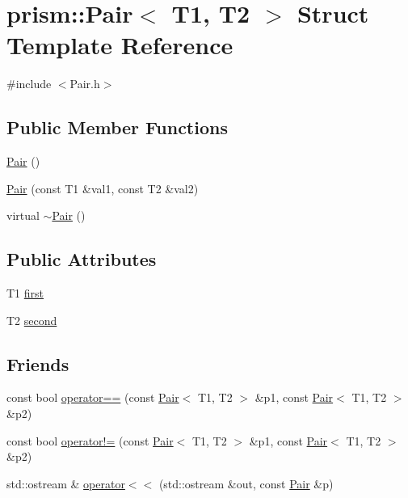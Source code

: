 \hypertarget{structprism_1_1_pair}{}\section{prism\+:\+:Pair$<$ T1, T2 $>$ Struct Template Reference}
\label{structprism_1_1_pair}


{\ttfamily \#include $<$Pair.\+h$>$}

\subsection*{Public Member Functions}
\begin{DoxyCompactItemize}
\item 
\hyperlink{structprism_1_1_pair_a01f54ce0c12eb6fa82d685b03be088e5}{Pair} ()
\item 
\hyperlink{structprism_1_1_pair_a87875f551ff0f9c7f54752664a909a03}{Pair} (const T1 \&val1, const T2 \&val2)
\item 
virtual \hyperlink{structprism_1_1_pair_ab5fdde19908ac6b0750a3a7156465e61}{$\sim$\+Pair} ()
\end{DoxyCompactItemize}
\subsection*{Public Attributes}
\begin{DoxyCompactItemize}
\item 
T1 \hyperlink{structprism_1_1_pair_a5284359e4f965f152726c7d3ff95021a}{first}
\item 
T2 \hyperlink{structprism_1_1_pair_aca5dc71f12a19dbe1591f4b7e867396a}{second}
\end{DoxyCompactItemize}
\subsection*{Friends}
\begin{DoxyCompactItemize}
\item 
const bool \hyperlink{structprism_1_1_pair_a8f7083ebabb27564eb111bda3c7a62bc}{operator==} (const \hyperlink{structprism_1_1_pair}{Pair}$<$ T1, T2 $>$ \&p1, const \hyperlink{structprism_1_1_pair}{Pair}$<$ T1, T2 $>$ \&p2)
\item 
const bool \hyperlink{structprism_1_1_pair_ad411adb326c40ee806d6bd94f155562f}{operator!=} (const \hyperlink{structprism_1_1_pair}{Pair}$<$ T1, T2 $>$ \&p1, const \hyperlink{structprism_1_1_pair}{Pair}$<$ T1, T2 $>$ \&p2)
\item 
std\+::ostream \& \hyperlink{structprism_1_1_pair_ad507a8268ac0c9d08cdfb644c3111276}{operator$<$$<$} (std\+::ostream \&out, const \hyperlink{structprism_1_1_pair}{Pair} \&p)
\end{DoxyCompactItemize}


